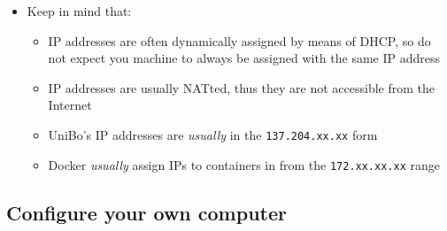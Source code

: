 \documentclass[handout]{beamer}\mode<presentation>{\usetheme{AMSCesenaPurpleAndGold}}
\begin{document}
\begin{frame}[allowframebreaks]
    \framebreak
    \begin{itemize}
    \item Keep in mind that:
    \begin{itemize}
    	\item IP addresses are often dynamically assigned by means of DHCP, so \alert{do not expect} you machine to always be assigned with the same IP address
    	\item IP addresses are usually NATted, thus they are not accessible from the Internet
    	\item UniBo's IP addresses are \emph{usually} in the \texttt{137.204.xx.xx} form
    	\item Docker \emph{usually} assign IPs to containers in from the \texttt{172.xx.xx.xx} range
    \end{itemize}
	\end{itemize}

\end{frame}

\subsection{Configure your own computer}
\end{document}
